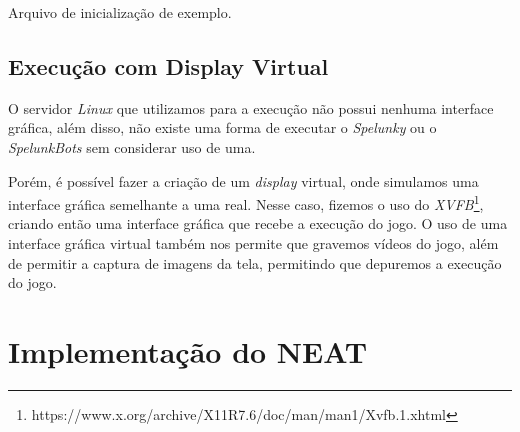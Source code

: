 \begin{algorithm}[H]

\caption[Arquivo de inicialização de exemplo.]
{\label{alg:ini-file}Arquivo de inicialização de exemplo.}
\end{algorithm}

\subsection{Execução com Display Virtual}

O servidor \textit{Linux} que utilizamos para a execução não possui nenhuma
interface gráfica, além disso, não existe uma forma de executar o
\textit{Spelunky} ou o \textit{SpelunkBots} sem considerar uso de uma.

Porém, é possível fazer a criação de um \textit{display} virtual, onde
simulamos uma interface gráfica semelhante a uma real. Nesse caso, fizemos o
uso do
\textit{XVFB}\footnote{https://www.x.org/archive/X11R7.6/doc/man/man1/Xvfb.1.xhtml},
criando então uma interface gráfica que recebe a execução do jogo. O uso de uma
interface gráfica virtual também nos permite que gravemos vídeos do jogo, além
de permitir a captura de imagens da tela, permitindo que depuremos a execução
do jogo.

\section{\label{section:neat-details}Implementação do NEAT}


